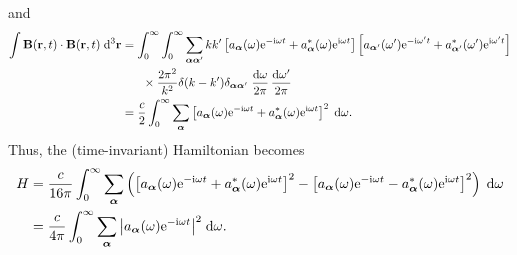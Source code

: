 \documentclass{article}
\numberwithin{equation}{section}
\begin{document}
and
\begin{equation}
\begin{split}
\int\mathbf{B}(\mathbf{r},t)\cdot\mathbf{B}(\mathbf{r},t)\;\mathrm{d}^3\mathbf{r} &= \int_0^\infty\int_0^\infty\sum_{\bm{\alpha}\bm{\alpha}'}kk'\left[a_{\bm{\alpha}}(\omega)\mathrm{e}^{-\mathrm{i}\omega t} + a_{\bm{\alpha}}^*(\omega)\mathrm{e}^{\mathrm{i}\omega t}\right]\left[a_{\bm{\alpha}'}(\omega')\mathrm{e}^{-\mathrm{i}\omega' t} + a_{\bm{\alpha}'}^*(\omega')\mathrm{e}^{\mathrm{i}\omega' t}\right]\\
&\hspace{0.05\textwidth}\times\frac{2\pi^2}{k^2}\delta(k - k')\delta_{\bm{\alpha}\bm{\alpha}'}\;\frac{\mathrm{d}\omega}{2\pi}\,\frac{\mathrm{d}\omega'}{2\pi}\\
&= \frac{c}{2}\int_0^\infty\sum_{\bm{\alpha}}\left[a_{\bm{\alpha}}(\omega)\mathrm{e}^{-\mathrm{i}\omega t} + a_{\bm{\alpha}}^*(\omega)\mathrm{e}^{\mathrm{i}\omega t}\right]^2\;\mathrm{d}\omega.
\end{split}
\end{equation}
Thus, the (time-invariant) Hamiltonian becomes
\begin{equation}
\begin{split}
H &= \frac{c}{16\pi}\int_0^\infty\sum_{\bm{\alpha}}\left(\left[a_{\bm{\alpha}}(\omega)\mathrm{e}^{-\mathrm{i}\omega t} + a_{\bm{\alpha}}^*(\omega)\mathrm{e}^{\mathrm{i}\omega t}\right]^2 - \left[a_{\bm{\alpha}}(\omega)\mathrm{e}^{-\mathrm{i}\omega t} - a_{\bm{\alpha}}^*(\omega)\mathrm{e}^{\mathrm{i}\omega t}\right]^2\right)\;\mathrm{d}\omega\\
&= \frac{c}{4\pi}\int_0^\infty\sum_{\bm{\alpha}}\abs{a_{\bm{\alpha}}(\omega)\mathrm{e}^{-\mathrm{i}\omega t}}^2\;\mathrm{d}\omega.
\end{split}
\end{equation}
\end{document}
